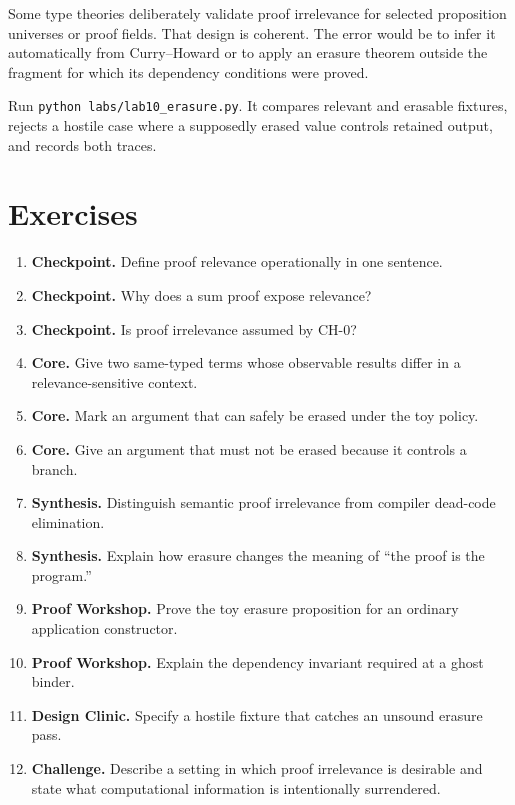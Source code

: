 

\begin{warningbox}
Some type theories deliberately validate proof irrelevance for selected proposition universes or proof fields. That design is coherent. The error would be to infer it automatically from Curry--Howard or to apply an erasure theorem outside the fragment for which its dependency conditions were proved.
\end{warningbox}

\begin{labbox}
Run \texttt{python labs/lab10_erasure.py}. It compares relevant and erasable fixtures, rejects a hostile case where a supposedly erased value controls retained output, and records both traces.
\end{labbox}

\section*{Exercises}
\begin{enumerate}[label=\textbf{10.\arabic*.}]
\item \textbf{Checkpoint.} Define proof relevance operationally in one sentence.
\item \textbf{Checkpoint.} Why does a sum proof expose relevance?
\item \textbf{Checkpoint.} Is proof irrelevance assumed by $\mathrm{CH}\text{-}0$?
\item \textbf{Core.} Give two same-typed terms whose observable results differ in a relevance-sensitive context.
\item \textbf{Core.} Mark an argument that can safely be erased under the toy policy.
\item \textbf{Core.} Give an argument that must not be erased because it controls a branch.
\item \textbf{Synthesis.} Distinguish semantic proof irrelevance from compiler dead-code elimination.
\item \textbf{Synthesis.} Explain how erasure changes the meaning of “the proof is the program.”
\item \textbf{Proof Workshop.} Prove the toy erasure proposition for an ordinary application constructor.
\item \textbf{Proof Workshop.} Explain the dependency invariant required at a ghost binder.
\item \textbf{Design Clinic.} Specify a hostile fixture that catches an unsound erasure pass.
\item \textbf{Challenge.} Describe a setting in which proof irrelevance is desirable and state what computational information is intentionally surrendered.
\end{enumerate}
